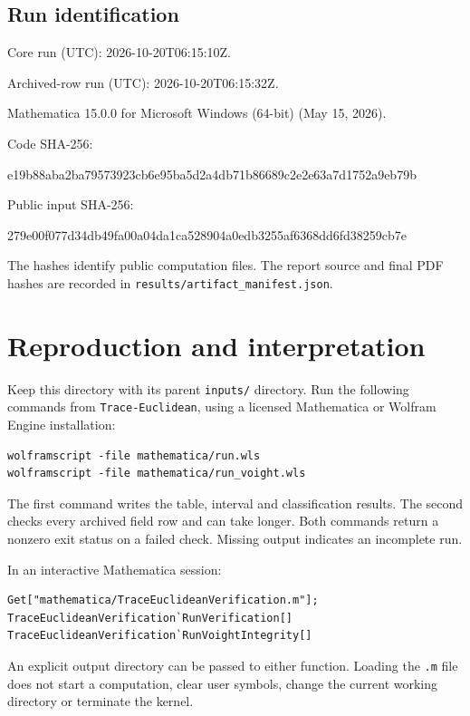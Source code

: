 \documentclass[12pt]{amsart}
\theoremstyle{remark}
\theoremstyle{definition}
\numberwithin{equation}{section}
\begin{document}
\subsection*{Run identification}
\noindent Core run (UTC): 2026-10-20T06:15:10Z.\par
\noindent Archived-row run (UTC): 2026-10-20T06:15:32Z.\par
\noindent Mathematica 15.0.0 for Microsoft Windows (64-bit) (May 15, 2026).\par
\noindent Code SHA-256:\par
{\fontsize{8}{10}\selectfont\ttfamily e19b88aba2ba79573923cb6e95ba5d2a4db71b86689c2e2e63a7d1752a9eb79b\par}
\noindent Public input SHA-256:\par
{\fontsize{8}{10}\selectfont\ttfamily 279e00f077d34db49fa00a04da1ca528904a0edb3255af6368dd6fd38259cb7e\par}

The hashes identify public computation files. The report source and final
PDF hashes are recorded in \texttt{results/artifact\_manifest.json}.

\clearpage
\section{Reproduction and interpretation}\label{sec:reproduction}

Keep this directory with its parent \texttt{inputs/} directory.
Run the following commands from \texttt{Trace-Euclidean}, using a licensed
Mathematica or Wolfram Engine installation:
\begin{lstlisting}[style=commands]
wolframscript -file mathematica/run.wls
wolframscript -file mathematica/run_voight.wls
\end{lstlisting}
The first command writes the table, interval and classification results.
The second checks every archived field row and can take longer. Both commands
return a nonzero exit status on a failed check. Missing output indicates an
incomplete run.

In an interactive Mathematica session:
\begin{lstlisting}[style=commands]
Get["mathematica/TraceEuclideanVerification.m"];
TraceEuclideanVerification`RunVerification[]
TraceEuclideanVerification`RunVoightIntegrity[]
\end{lstlisting}
An explicit output directory can be passed to either function. Loading the
\texttt{.m} file does not start a computation, clear user symbols, change the
current working directory or terminate the kernel.
\end{document}
